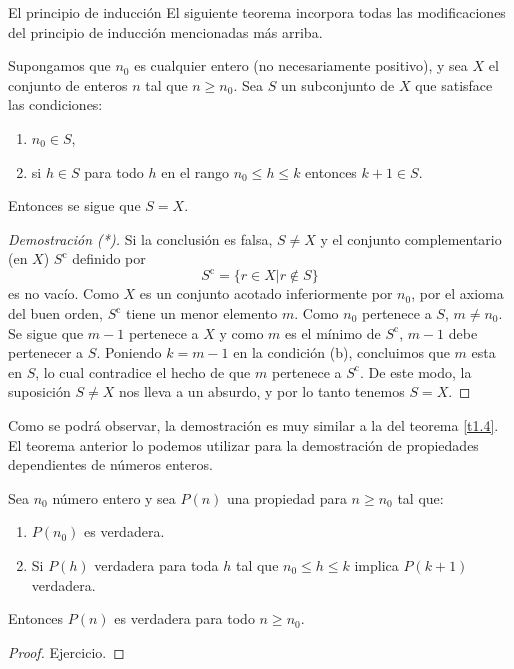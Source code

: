 \begin{section}{El principio de inducción}
El siguiente teorema incorpora todas las modificaciones del principio de inducción mencionadas más arriba.

\begin{teorema} Supongamos que $n_0$ es cualquier entero (no necesariamente positivo), y sea $X$ el conjunto de enteros $n$ tal que $ n \ge n_0$. Sea $S$ un subconjunto de $X$ que satisface las condiciones: 
\begin{enumerate}[label=(\alph*)]
\item $n_0 \in S$,
\item si $h\in S$ para todo $h$ en el rango $n_0 \le h \le k$ entonces $k+1 \in S$.
\end{enumerate}
Entonces se sigue que $S=X$.
\end{teorema}
\begin{proof}[Demostración (*)]
Si la conclusión es falsa, $S \not= X$ y el conjunto complementario (en $X$)  $S^{\text{c}}$ definido por
$$
S^{\text{c}}= \{ r \in X | r\not\in S\}
$$
es no vacío. Como $X$ es un conjunto acotado inferiormente por $n_0$, por el axioma del buen orden, $S^{\text{c}}$ tiene un menor elemento $m$. Como $n_0$ pertenece a $S$, $m\not=n_0$. Se sigue que $m-1$ pertenece a $X$ y como $m$ es el mínimo de $S^{\text{c}}$, $m-1$ debe pertenecer a $S$. Poniendo $k=m-1$ en la condición (b), concluimos que $m$ esta en $S$, lo cual contradice el hecho de que $m$ pertenece a $S^{\text{c}}$. De este modo, la suposición $S \not= X$ nos lleva a un absurdo, y por lo tanto tenemos $S= X$.
\end{proof}

Como se podrá observar, la demostración es muy similar a  la del teorema \ref{t1.4}. El teorema anterior lo podemos utilizar para la demostración de propiedades dependientes de números enteros.

\begin{teorema}\label{ind-completa} Sea $n_0$ número entero y sea $P(n)$ una propiedad para $n \ge n_0$ tal que:
\begin{enumerate}[label=(\alph*)]
\item $P(n_0)$ es verdadera.
\item Si $P(h)$ verdadera para toda $h$ tal que $n_0 \le h \le k$ implica $P(k + 1)$ verdadera.
\end{enumerate}
Entonces $P(n)$ es verdadera para todo $n \ge n_0$.
\end{teorema}
\begin{proof} Ejercicio.
\end{proof}




\end{section}
